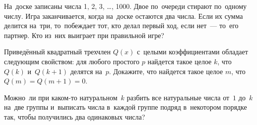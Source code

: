 

\begin{problems}

\item
На~доске записаны числа 1, 2, 3, \ldots, 1000.
Двое по~очереди стирают по~одному числу.
Игра заканчивается, когда на~доске остаются два числа.
Если их сумма делится на~три, то~побеждает тот, кто делал первый ход, если
нет~--- то~его партнер.
Кто из~них выиграет при правильной игре?


\item
Приведённый квадратный трехчлен $Q(x)$ с~целыми коэффициентами обладает
следующим свойством:
для любого простого $p$ найдется такое целое $k$, что $Q(k)$ и~$Q(k+1)$ делятся
на~$p$.
Докажите, что найдется такое целое $m$, что $Q(m) = Q(m + 1) = 0$.




\item
Можно~ли при каком-то натуральном~$k$ разбить все натуральные числа
от~$1$ до~$k$ на~две группы и~выписать числа в~каждой группе подряд в~некотором
порядке так, чтобы получились два одинаковых числа?



\end{problems}
